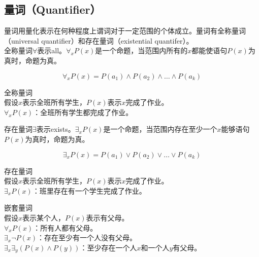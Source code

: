 \vspace{0.5cm}

\subsection{量词（Quantifier）}

量词用量化表示在何种程度上谓词对于一定范围的个体成立。量词有全称量词（universal quantifier）和存在量词（existential quantifer）。\\

全称量词$ \forall $表示all。$ \forall_x P(x) $是一个命题，当范围内所有的$ x $都能使语句$ P(x) $为真时，命题为真。

\vspace{-0.5cm}

$$
	\forall_x P(x) = P(a_1) \wedge P(a_2) \wedge \dots \wedge P(a_k)
$$

\begin{tcolorbox}
	全称量词\\
	假设$ x $表示全班所有学生，$ P(x) $表示$ x $完成了作业。\\
	$ \forall_x P(x) $：全班所有学生都完成了作业。
\end{tcolorbox}

存在量词$ \exists $表示exists。$ \exists_x P(x) $是一个命题，当范围内存在至少一个$ x $能够语句$ P(x) $为真时，命题为真。

\vspace{-0.5cm}

$$
	\exists_x P(x) = P(a_1) \vee P(a_2) \vee \dots \vee P(a_k)
$$

\begin{tcolorbox}
	存在量词\\
	假设$ x $表示全班所有学生，$ P(x) $表示$ x $完成了作业。\\
	$ \exists_x P(x) $：班里存在有一个学生完成了作业。
\end{tcolorbox}

\begin{tcolorbox}
	嵌套量词\\
	假设$ x $表示某个人，$ P(x) $表示有父母。\\
	$ \forall_x P(x) $：所有人都有父母。\\
	$ \exists_x \neg P(x) $：存在至少有一个人没有父母。\\
	$ \exists_x \exists_y (P(x) \wedge P(y)) $：至少存在一个人$ x $和一个人$ y $有父母。
\end{tcolorbox}

